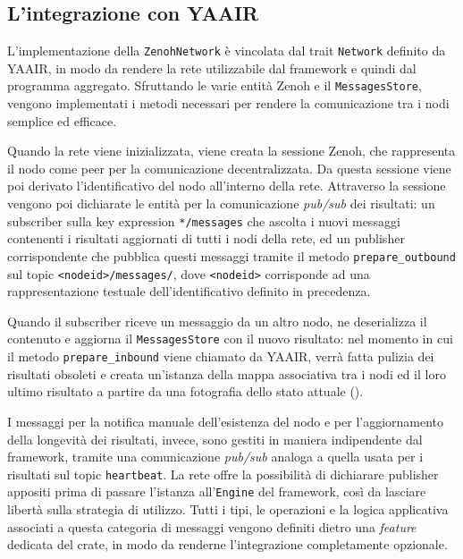

\subsection{L'integrazione con YAAIR}
\label{ssec:yaair-integration}

L'implementazione della \texttt{ZenohNetwork} è vincolata dal trait
\texttt{Network} definito da \ac{YAAIR}, in modo da rendere la rete utilizzabile
dal framework e quindi dal programma aggregato.
Sfruttando le varie entità Zenoh e il \texttt{MessagesStore}, vengono implementati
i metodi necessari per rendere la comunicazione tra i nodi semplice ed efficace.

Quando la rete viene inizializzata, viene creata la sessione Zenoh, che rappresenta
il nodo come peer per la comunicazione decentralizzata. Da questa sessione viene
poi derivato l'identificativo del nodo all'interno della rete.
Attraverso la sessione vengono poi dichiarate le entità per la comunicazione
\emph{pub/sub} dei risultati: un subscriber sulla key expression \texttt{*/messages} che
ascolta i nuovi messaggi contenenti i risultati aggiornati di tutti i nodi della
rete, ed un publisher corrispondente che pubblica questi messaggi tramite il metodo
\texttt{prepare\_outbound} sul topic \texttt{<nodeid>/messages/}, dove \texttt{<nodeid>}
corrisponde ad una rappresentazione testuale dell'identificativo definito in precedenza.

Quando il subscriber riceve un messaggio da un altro nodo, ne deserializza il
contenuto e aggiorna il \texttt{MessagesStore} con il nuovo risultato: nel momento
in cui il metodo \texttt{prepare\_inbound} viene chiamato da \ac{YAAIR}, verrà
fatta pulizia dei risultati obsoleti e creata un'istanza della mappa associativa
tra i nodi ed il loro ultimo risultato a partire da una fotografia dello stato attuale
().



I messaggi per la notifica manuale dell'esistenza del nodo e per l'aggiornamento
della longevità dei risultati, invece, sono gestiti in maniera indipendente dal
framework, tramite una comunicazione \emph{pub/sub} analoga a quella usata per i
risultati sul topic \texttt{heartbeat}. La rete offre la possibilità di
dichiarare publisher appositi prima di passare l'istanza all'\texttt{Engine} del
framework, così da lasciare libertà sulla strategia di utilizzo.
Tutti i tipi, le operazioni e la logica applicativa associati a questa categoria
di messaggi vengono definiti dietro una \emph{feature} dedicata del crate, in modo
da renderne l'integrazione completamente opzionale.

